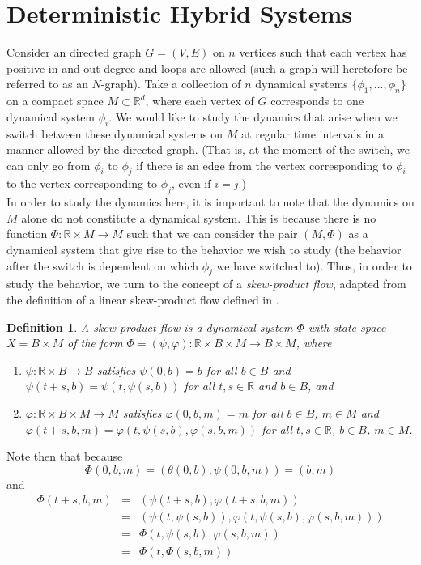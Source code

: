 \documentclass[11pt]{article}
\newtheorem{defn}[thm]{Definition}
\begin{document}
\section{Deterministic Hybrid Systems}


\indent Consider an directed graph $G=(V,E)$ on $n$ vertices such that each vertex has positive in and out degree and loops are allowed (such a graph will heretofore be referred to as an $N$-graph).  Take a collection of $n$ dynamical systems $\{\phi_1,...,\phi_n\}$ on a compact space $M \subset \mathbb{R}^d$, where each vertex of $G$ corresponds to one dynamical system $\phi_i$.  We would like to study the dynamics that arise when we switch between these dynamical systems on $M$ at regular time intervals in a manner allowed by the directed graph. (That is, at the moment of the switch, we can only go from $\phi_i$ to $\phi_j$ if there is an edge from the vertex corresponding to $\phi_i$ to the vertex corresponding to $\phi_j$, even if $i=j$.) \\
\indent In order to study the dynamics here, it is important to note that the dynamics on $M$ alone do not constitute a dynamical system.  This is because there is no function $\Phi:\mathbb{R}\times M\rightarrow M$ such that we can consider the pair $(M,\Phi)$ as a dynamical system that give rise to the behavior we wish to study (the behavior after the switch is dependent on which $\phi_j$ we have switched to).  Thus, in order to study the behavior, we turn to the concept of a \emph{skew-product flow}, adapted from the definition of a linear skew-product flow defined in \cite{skewproduct}.
\begin{defn}\label{skewproduct}
A skew product flow is a dynamical system $\Phi$ with state space $X=B\times M$ of the form $\Phi=(\psi,\varphi):\mathbb{R}\times B\times M\rightarrow B\times M$, where 
\begin{enumerate}
\item $\psi:\mathbb{R}\times B\rightarrow B$ satisfies $\psi(0,b)=b$ for all $b\in B$ and $\psi(t+s,b)=\psi(t,\psi(s,b))$ for all $t,s\in\mathbb{R}$ and $b\in B$, and 
\item$\varphi:\mathbb{R}\times B\times M\rightarrow M$ satisfies $\varphi(0,b,m)=m$ for all $b\in B$, $m\in M$ and $\varphi(t+s,b,m)=\varphi(t,\psi(s,b),\varphi(s,b,m))$ for all $t,s\in\mathbb{R}$, $b\in B$, $m\in M$. 
\end{enumerate}
\end{defn} 
\noindent Note then that because $$\Phi(0,b,m)=(\theta(0,b), \psi(0,b,m))=(b,m)$$ and 
\begin{eqnarray*}
\Phi(t+s,b,m)&=&(\psi(t+s,b),\varphi(t+s,b,m))\\
&=&(\psi(t,\psi(s,b)),\varphi(t,\psi(s,b),\varphi(s,b,m)))\\
&=&\Phi(t,\psi(s,b),\varphi(s,b,m))\\
&=&\Phi(t,\Phi(s,b,m))
\end{eqnarray*}
\end{document}

